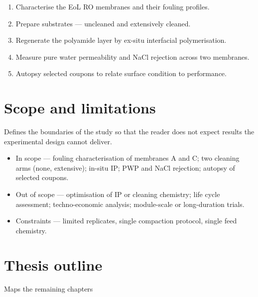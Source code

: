 \begin{enumerate}
  \item Characterise the EoL RO membranes and their fouling profiles.
  \item Prepare substrates --- uncleaned and extensively cleaned.
  \item Regenerate the polyamide layer by ex-situ interfacial polymerisation.
  \item Measure pure water permeability and NaCl rejection across two membranes.
  \item Autopsy selected coupons to relate surface condition to performance.
\end{enumerate}




\section{Scope and limitations}
\label{sec:scope}
Defines the boundaries of the study so that the reader does not expect results the experimental design cannot deliver.

\begin{itemize}
  \item In scope --- fouling characterisation of membranes A and C; two cleaning arms (none, extensive); in-situ IP; PWP and NaCl rejection; autopsy of selected coupons.
  \item Out of scope --- optimisation of IP or cleaning chemistry; life cycle assessment; techno-economic analysis; module-scale or long-duration trials.
  \item Constraints --- limited replicates, single compaction protocol, single feed chemistry.
\end{itemize}



\section{Thesis outline}
\label{sec:outline}
Maps the remaining chapters

